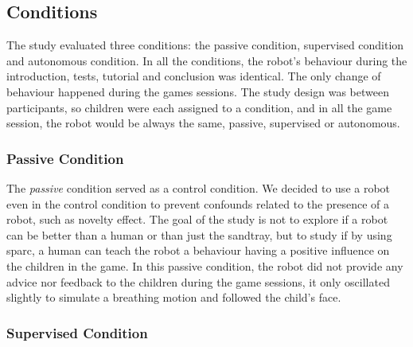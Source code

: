 
\subsection{Conditions}
The study evaluated three conditions: the passive condition, supervised condition and autonomous condition. In all the conditions, the robot's behaviour during the introduction, tests, tutorial and conclusion was identical. The only change of behaviour happened during the games sessions. The study design was between participants, so children were each assigned to a condition, and in all the game session, the robot would be always the same, passive, supervised or autonomous. %

\subsubsection{Passive Condition}

The \textit{passive} condition served as a control condition. We decided to use a robot even in the control condition to prevent confounds related to the presence of a robot, such as novelty effect. The goal of the study is not to explore if a robot can be better than a human or than just the sandtray, but to study if by using \gls{sparc}, a human can teach the robot a behaviour having a positive influence on the children in the game. In this passive condition, the robot did not provide any advice nor feedback to the children during the game sessions, it only oscillated slightly to simulate a breathing motion and followed the child's face. 




\subsubsection{Supervised Condition}

